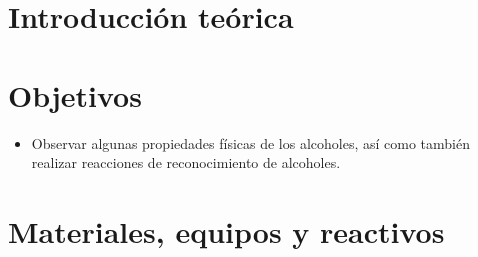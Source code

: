 
\section{Introducción teórica}



\section{Objetivos}

\begin{itemize}
    \item Observar algunas propiedades físicas de los alcoholes, así como también realizar reacciones de reconocimiento de alcoholes.
\end{itemize}

\section{Materiales, equipos y reactivos}

